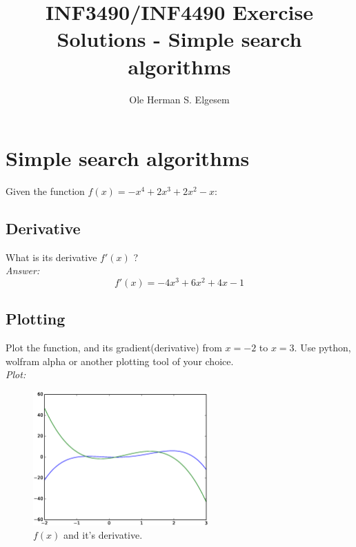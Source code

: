 
\title{\vspace{-2cm}INF3490/INF4490 Exercise Solutions - Simple search algorithms}
\author{Ole Herman S. Elgesem}
\date{}

\setlength\parindent{0pt}


    \renewcommand\marginsymbol[1][0pt]{%
  \tabto*{0cm}\makebox[-1cm][c]{$\mathbb{P}$}\tabto*{\TabPrevPos}}

\maketitle


\section{Simple search algorithms}

Given the function \(f(x) = -x^4 + 2x^3 + 2x^2 - x\):

\subsection{Derivative}
What is its derivative \(f'(x)\) ?\\

\textit{Answer:}
\[f'(x) = -4x^3 + 6x^2 + 4x - 1\]

\subsection{Plotting \marginsymbol}
Plot the function, and its gradient(derivative) from \(x=-2\) to \(x=3\).
Use python, wolfram alpha or another plotting tool of your choice.\\

\textit{Plot:}
\begin{figure}[H]
\begin{center}
\includegraphics[width=0.6\textwidth]{eps/w1e1b.eps}
\caption{\(f(x)\) and it's derivative.}
\label{fig:w1e1b}
\end{center}
\end{figure}

